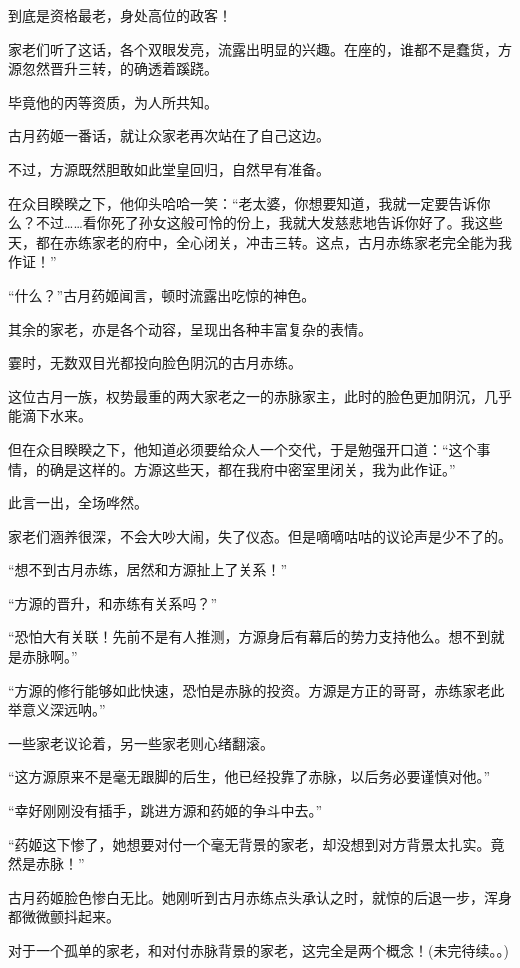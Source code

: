 \begin{this_body}
到底是资格最老，身处高位的政客！

家老们听了这话，各个双眼发亮，流露出明显的兴趣。在座的，谁都不是蠢货，方源忽然晋升三转，的确透着蹊跷。

毕竟他的丙等资质，为人所共知。

古月药姬一番话，就让众家老再次站在了自己这边。

不过，方源既然胆敢如此堂皇回归，自然早有准备。

在众目睽睽之下，他仰头哈哈一笑：“老太婆，你想要知道，我就一定要告诉你么？不过……看你死了孙女这般可怜的份上，我就大发慈悲地告诉你好了。我这些天，都在赤练家老的府中，全心闭关，冲击三转。这点，古月赤练家老完全能为我作证！”

“什么？”古月药姬闻言，顿时流露出吃惊的神色。

其余的家老，亦是各个动容，呈现出各种丰富复杂的表情。

霎时，无数双目光都投向脸色阴沉的古月赤练。

这位古月一族，权势最重的两大家老之一的赤脉家主，此时的脸色更加阴沉，几乎能滴下水来。

但在众目睽睽之下，他知道必须要给众人一个交代，于是勉强开口道：“这个事情，的确是这样的。方源这些天，都在我府中密室里闭关，我为此作证。”

此言一出，全场哗然。

家老们涵养很深，不会大吵大闹，失了仪态。但是嘀嘀咕咕的议论声是少不了的。

“想不到古月赤练，居然和方源扯上了关系！”

“方源的晋升，和赤练有关系吗？”

“恐怕大有关联！先前不是有人推测，方源身后有幕后的势力支持他么。想不到就是赤脉啊。”

“方源的修行能够如此快速，恐怕是赤脉的投资。方源是方正的哥哥，赤练家老此举意义深远呐。”

一些家老议论着，另一些家老则心绪翻滚。

“这方源原来不是毫无跟脚的后生，他已经投靠了赤脉，以后务必要谨慎对他。”

“幸好刚刚没有插手，跳进方源和药姬的争斗中去。”

“药姬这下惨了，她想要对付一个毫无背景的家老，却没想到对方背景太扎实。竟然是赤脉！”

古月药姬脸色惨白无比。她刚听到古月赤练点头承认之时，就惊的后退一步，浑身都微微颤抖起来。

对于一个孤单的家老，和对付赤脉背景的家老，这完全是两个概念！(未完待续。。)

\end{this_body}

